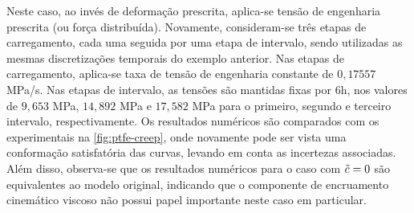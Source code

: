 \documentclass[Tese.tex]{subfiles}
\begin{document}
{Neste caso, ao invés de deformação prescrita, aplica-se tensão de engenharia prescrita (ou força distribuída). Novamente, consideram-se três etapas de carregamento, cada uma seguida por uma etapa de intervalo, sendo utilizadas as mesmas discretizações temporais do exemplo anterior. Nas etapas de carregamento, aplica-se taxa de tensão de engenharia constante de $0,17557$ MPa/s. Nas etapas de intervalo, as tensões são mantidas fixas por $6$h, nos valores de $9,653$ MPa, $14,892$ MPa e $17,582$ MPa para o primeiro, segundo e terceiro intervalo, respectivamente. Os resultados numéricos são comparados com os experimentais na \autoref{fig:ptfe-creep}, onde novamente pode ser vista uma conformação satisfatória das curvas, levando em conta as incertezas associadas. Além disso, observa-se que os resultados numéricos para o caso com $\tilde{c}=0$ são equivalentes ao modelo original, indicando que o componente de encruamento cinemático viscoso não possui papel importante neste caso em particular.

}
\end{document}

